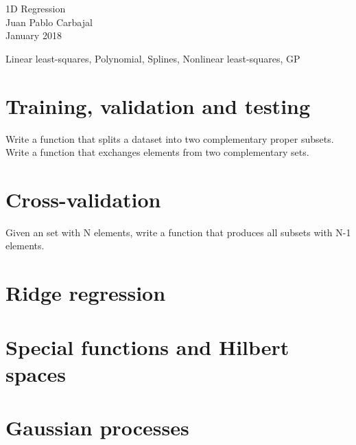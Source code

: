 \documentclass[10pt,english,final,a4paper]{exam}
\begin{document}
\begin{center}
{\Large 1D Regression}\\
Juan Pablo Carbajal\\
January 2018
\end{center}

\vspace{1.5em}

Linear least-squares, Polynomial, Splines, Nonlinear least-squares, GP


\section{Training, validation and testing}
\begin{questions}
Write a function that splits a dataset into two complementary proper subsets.
Write a function that exchanges elements from two complementary sets.
\end{questions}

\section{Cross-validation}
\begin{questions}
\question Given an set with N elements, write a function that produces all subsets with N-1 elements.
\end{questions}

\section{Ridge regression}
\begin{questions}
\end{questions}

\section{Special functions and Hilbert spaces}
\begin{questions}
\end{questions}

\section{Gaussian processes}
\begin{questions}
\end{questions}
\end{document}

